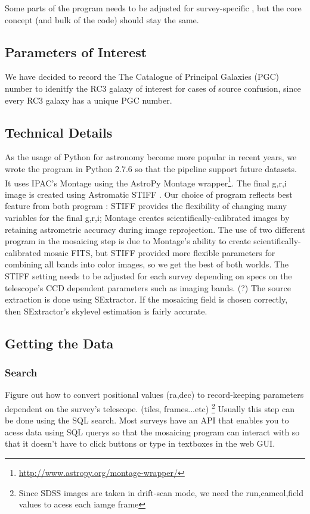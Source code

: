 \documentclass[5p]{elsarticle}
\begin{document}
	Some parts of the program needs to be adjusted for survey-specific , but the core concept (and bulk of the code) should stay the same. 
		\subsection{Parameters of Interest }
	We have decided to record the The Catalogue of Principal Galaxies (PGC) number to idenitfy the RC3 galaxy of interest for cases of source confusion, since every RC3 galaxy has a unique PGC number. 

		\subsection{Technical Details}
		As the usage of Python for astronomy become more popular in recent years, we wrote the program in Python 2.7.6 so that the pipeline support future datasets.	 It uses IPAC's Montage  \cite{montage} using the AstroPy Montage wrapper\footnote{\url{http://www.astropy.org/montage-wrapper/}}.  The final g,r,i image is created using Astromatic STIFF \cite{stiff} . Our choice of program reflects best feature from both program : STIFF provides the flexibility of changing many variables for the final g,r,i; Montage creates scientifically-calibrated images by retaining astrometric accuracy during image reprojection. The use of two different program in the mosaicing step is due to Montage's ability to create scientifically-calibrated mosaic FITS, but STIFF provided more flexible parameters for combining all bands into color images, so we get the best of both worlds. The STIFF setting needs to be adjusted for each survey depending on specs on the telescope's CCD dependent parameters such as imaging bands. (?) The source extraction is done using SExtractor. If the mosaicing field is chosen correctly, then SExtractor's skylevel estimation is fairly accurate.
	\subsection{Getting the Data}
		\subsubsection{Search}
			Figure out how to convert positional values (ra,dec) to record-keeping parameters dependent on the survey's telescope. (tiles, frames...etc) \footnote{Since SDSS images are taken in drift-scan mode, we need the run,camcol,field values to acess each iamge frame} Usually this step can be done using the SQL search. 
Most surveys have an API that enables you to acess data using SQL querys so that the mosaicing program can interact with so that it doesn't have to  click buttons or type in textboxes in the web GUI. 
\end{document}
